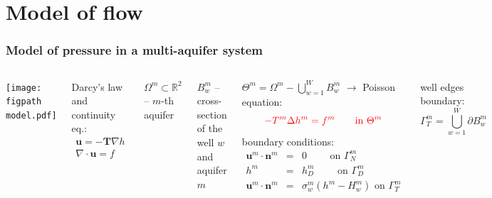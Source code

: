 \documentclass[10pt, xcolor=dvipsnames]{beamer} %
\newcommand{\figpath}{../graphics/}
\begin{document}
\section{Model of flow}
\begin{frame}
  \frametitle{Model of pressure in a multi-aquifer system}
   \begin{columns}
        \texttt{[image: \\figpath model.pdf]}
        
        Darcy's law and continuity eq.:
        \begin{eqnarray*}
            \mathbf{u}=-\mathbf{T}\nabla h \label{eqn:1}\\ 
            \nabla \cdot \mathbf{u} = f  \label{eqn:2} 
        \end{eqnarray*}
        
        $\Omega^m \subset \mathbb{R}^2$ -- $m$-th aquifer
        
        $B_w^m$ -- cross-section of the well $w$ and aquifer $m$

        $\Theta^m=\Omega^m-\bigcup \limits _{w=1}^{W} B^m_w$
        $\rightarrow$ Poisson equation:
        \begin{equation} 
            \color{red}{-T^m\Delta{}h^m=f^m  \qquad \textrm{in } \Theta^m}
        \end{equation} %
        boundary conditions:
        \begin{eqnarray*}
            \mathbf{u}^m \cdot \mathbf{n}^m &=& 0 \qquad \textrm{ on } \Gamma_N^m \\
            h^m &=& h^m_D \qquad \textrm{ on } \Gamma_D^m \\
            \mathbf{u}^m \cdot \mathbf{n}^m &=& \sigma^m_w \left(h^m-H^m_w\right) \textrm{ on } \Gamma^m_T \\
        \end{eqnarray*}
    
        well edges boundary:
        \[ \Gamma^m_T=\bigcup \limits _{w=1}^{W} \partial{}B^m_w \]
        
    \end{columns}
\end{frame}
\end{document}
